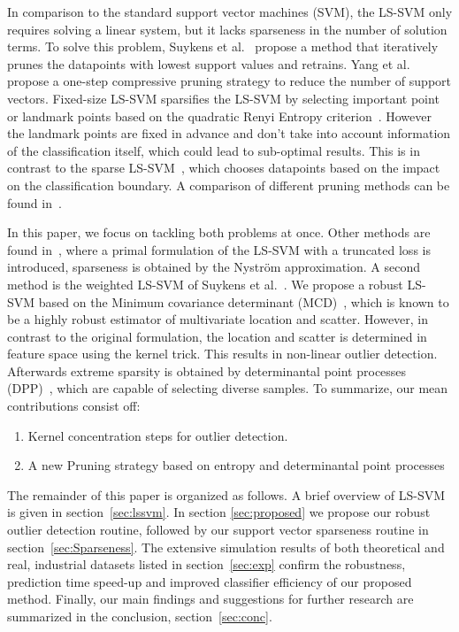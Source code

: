 \documentclass[preprint,12pt]{elsarticle}
\begin{document}
	In comparison to the standard support vector machines (SVM), the LS-SVM only requires solving a linear system, but it lacks sparseness in the number of solution terms. To solve this problem, Suykens et al.~\cite{suykens2000sparse} propose a method that iteratively prunes the datapoints with lowest support values and retrains. Yang et al.~\cite{yang2014sparse} propose a one-step compressive pruning strategy to reduce the number of support vectors. Fixed-size LS-SVM sparsifies the LS-SVM by selecting important point or landmark points based on the quadratic Renyi Entropy criterion~\cite{suykens2002least}. However the landmark points are fixed in advance and don't take into account information of the classification itself, which could lead to sub-optimal results. This is in contrast to the sparse LS-SVM~\cite{suykens2000sparse}, which chooses datapoints based on the impact on the classification boundary. A comparison of different pruning methods can be found in~\cite{hoegaerts2004comparison}. 
	
	In this paper, we focus on tackling both problems at once.
	Other methods are found in~\cite{chen2018sparse}, where a primal formulation of the LS-SVM with a truncated loss is introduced, sparseness is obtained by the Nystr\"{o}m approximation. A second method is the weighted LS-SVM of Suykens et al.~\cite{suykens2002weighted}. We propose a robust LS-SVM based on the Minimum covariance determinant (MCD)~\cite{hubert2010minimum}, which is known to be a highly robust
	estimator of multivariate location and scatter. However, in contrast to the original formulation, the location and scatter is determined in feature space using the kernel trick. This results in non-linear outlier detection. Afterwards extreme sparsity is obtained by determinantal point processes (DPP)~\cite{kulesza2012determinantal}, which are capable of selecting diverse samples. To summarize, our mean contributions consist off:
	\begin{enumerate}
		\item Kernel concentration steps for outlier detection.
		\item A new Pruning strategy based on entropy and determinantal point processes
	\end{enumerate}
	
	The remainder of this paper is organized as follows. A brief overview of LS-SVM is given in section~\ref{sec:lssvm}. In section \ref{sec:proposed} we propose our robust outlier detection routine, followed by our support vector sparseness routine in section~\ref{sec:Sparseness}. The extensive simulation results of both theoretical and real, industrial datasets listed in section~\ref{sec:exp} confirm the robustness, prediction time speed-up and improved classifier efficiency of our proposed method. Finally, our main findings and suggestions for further research are summarized in the conclusion, section~\ref{sec:conc}. 
	
\end{document}
